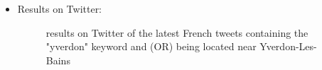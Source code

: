 \documentclass[a4paper,11pt]{report}
\begin{document}
\begin{enumerate}
\begin{itemize}
		\item Results on Twitter:
		\begin{figure}[H]
		\vspace{-5pt}
		\begin{center}
		\vspace{-5pt}
		\caption{results on Twitter of the latest French tweets containing the "yverdon" keyword and (OR) being located near Yverdon-Les-Bains}
		\end{center}
		\end{figure}
		\vspace{-20pt}
	\end{itemize}
	

\end{enumerate}
\end{document}
